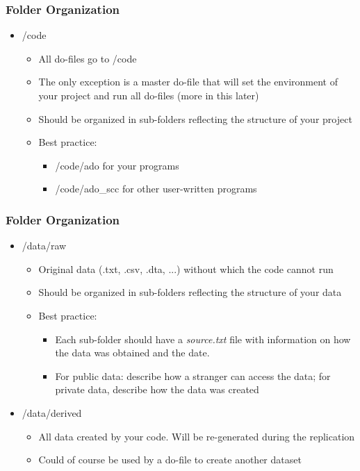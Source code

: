 \documentclass{beamer}
\begin{document}
\frame
{
	\frametitle{Folder Organization}
	
	\begin{itemize}
		\item[] /code
		\begin{itemize}
			\item All do-files go to /code
			\item The only exception is a master do-file that will set the environment of your project and run all do-files (more in this later)
			\item Should be organized in sub-folders reflecting the structure of your project
			\item Best practice:
			\begin{itemize}
				\item /code/ado for your programs 
				\item /code/ado\_scc for other user-written programs
			\end{itemize}
		\end{itemize}
	\end{itemize}
	
	
}

\frame
{
	\frametitle{Folder Organization}
	
	\begin{itemize}
		\item[] /data/raw
		\begin{itemize}
			\item Original data (.txt, .csv, .dta, ...) without which the code cannot run
			\item Should be organized in sub-folders reflecting the structure of your data
			\item Best practice:
			\begin{itemize}
				\item Each sub-folder should have a \textsl{source.txt} file with information on how the data was obtained and the date.
				\item For public data: describe how a stranger can access the data; for private data, describe how the data was created
			\end{itemize}
		\end{itemize}
	\item[] /data/derived
	\begin{itemize}
		\item All data created by your code. Will be re-generated during the replication
		\item Could of course be used by a do-file to create another dataset
	\end{itemize}
	\end{itemize}
	
	
}
\end{document}
